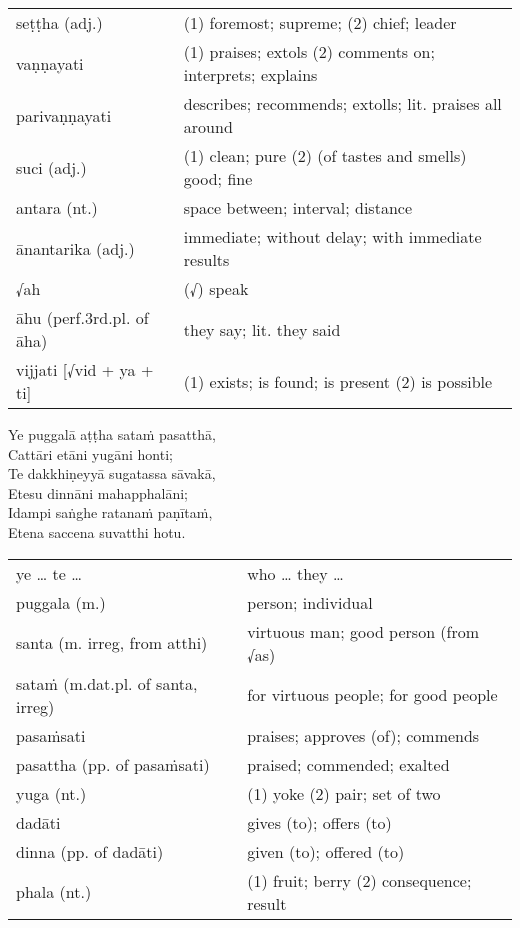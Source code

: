\documentclass[11pt,oneside]{memoir}
\begin{document}
\begin{longtable}{L{\colOne} L{\colTwo}}
seṭṭha (adj.) & (1) foremost; supreme; (2) chief; leader\\[0pt]
vaṇṇayati & (1) praises; extols (2) comments on; interprets; explains\\[0pt]
parivaṇṇayati & describes; recommends; extolls; lit. praises all around\\[0pt]
suci (adj.) & (1) clean; pure (2) (of tastes and smells) good; fine\\[0pt]
antara (nt.) & space between; interval; distance\\[0pt]
ānantarika (adj.) & immediate; without delay; with immediate results\\[0pt]
√ah & (√) speak\\[0pt]
āhu (perf.3rd.pl. of āha) & they say; lit. they said\\[0pt]
vijjati [√vid + ya + ti] & (1) exists; is found; is present (2) is possible\\[0pt]
\end{longtable}

\begin{spacedquote}
Ye puggalā aṭṭha sataṁ pasatthā, \\[0pt]
Cattāri etāni yugāni honti; \\[0pt]
Te dakkhiṇeyyā sugatassa sāvakā, \\[0pt]
Etesu dinnāni mahapphalāni; \\[0pt]
Idampi saṅghe ratanaṁ paṇītaṁ, \\[0pt]
Etena saccena suvatthi hotu.
\end{spacedquote}

\begin{longtable}{L{\colOne} L{\colTwo}}
ye \ldots{} te \ldots{} & who \ldots{} they \ldots{}\\[0pt]
puggala (m.) & person; individual\\[0pt]
santa (m. irreg, from atthi) & virtuous man; good person (from √as)\\[0pt]
sataṁ (m.dat.pl. of santa, irreg) & for virtuous people; for good people\\[0pt]
pasaṁsati & praises; approves (of); commends\\[0pt]
pasattha (pp. of pasaṁsati) & praised; commended; exalted\\[0pt]
yuga (nt.) & (1) yoke (2) pair; set of two\\[0pt]
dadāti & gives (to); offers (to)\\[0pt]
dinna (pp. of dadāti) & given (to); offered (to)\\[0pt]
phala (nt.) & (1) fruit; berry (2) consequence; result\\[0pt]
\end{longtable}
\end{document}
